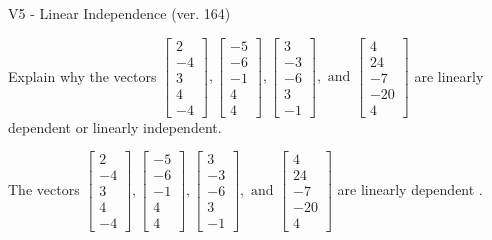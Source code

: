 \begin{exercise}
  \begin{exerciseTitle}V5 - Linear Independence (ver. 164)\end{exerciseTitle}
  \begin{exerciseStatement}
    Explain why the vectors \(\left[\begin{array}{r}
2 \\
-4 \\
3 \\
4 \\
-4
\end{array}\right] , \left[\begin{array}{r}
-5 \\
-6 \\
-1 \\
4 \\
4
\end{array}\right] , \left[\begin{array}{r}
3 \\
-3 \\
-6 \\
3 \\
-1
\end{array}\right] , \text{ and } \left[\begin{array}{r}
4 \\
24 \\
-7 \\
-20 \\
4
\end{array}\right]\) are linearly dependent or linearly independent.	


  \end{exerciseStatement}
  \begin{exerciseAnswer}
   The vectors \(\left[\begin{array}{r}
2 \\
-4 \\
3 \\
4 \\
-4
\end{array}\right] , \left[\begin{array}{r}
-5 \\
-6 \\
-1 \\
4 \\
4
\end{array}\right] , \left[\begin{array}{r}
3 \\
-3 \\
-6 \\
3 \\
-1
\end{array}\right] , \text{ and } \left[\begin{array}{r}
4 \\
24 \\
-7 \\
-20 \\
4
\end{array}\right]\) are 
  	 linearly dependent  .
  


  \end{exerciseAnswer}
\end{exercise}